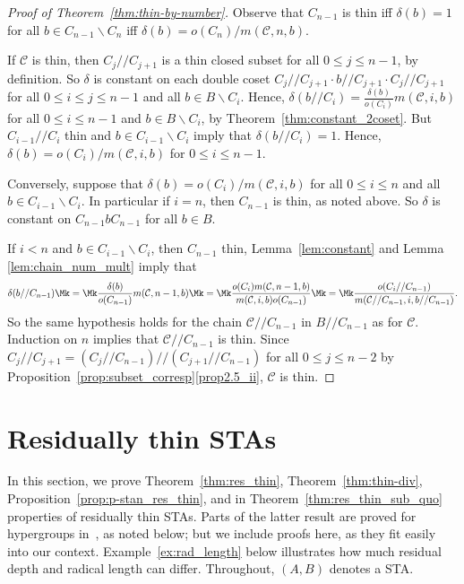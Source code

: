 \begin{proof} [Proof of Theorem~\ref{thm:thin-by-number}]

Observe that $C_{n-1}$ is thin iff $\delta(b) = 1$ for all $b \in
C_{n-1}\backslash C_n$ iff $\delta(b) =
o(C_n)/m(\mathcal{C}, n, b)$.

If $\mathcal{C}$ is thin, then $C_j//C_{j+1}$ is a thin closed subset
for all $0 \leq j \leq n-1$, by definition. So $\delta$ is constant on
each double coset $C_j//C_{j+1}\cdot b//C_{j+1}\cdot C_j//C_{j+1}$ for
all $0 \leq i \leq j \leq n-1$ and all $b \in B\backslash C_i$. Hence, $\delta(b//C_i) =
\frac{\delta(b)}{o(C_i)}m(\mathcal{C}, i, b)$ for all $0 \leq i \leq
n-1$ and $b \in B\backslash C_i$, by Theorem~\ref{thm:constant_2coset}.
But $C_{i-1}//C_i$ thin and $b \in C_{i-1}\backslash C_i$ imply that
$\delta(b//C_i) = 1$. Hence, $\delta(b) = o(C_i)/m(\mathcal{C},
i, b)$ for $0 \leq i \leq n-1$.

Conversely, suppose that $\delta(b) = o(C_i)/m(\mathcal{C}, i, b)$ for
all $0 \leq i \leq n$ and all $b \in C_{i-1}\backslash C_i$. In
particular if $i = n$, then $C_{n-1}$ is thin, as noted above. So
$\delta$ is constant on $C_{n-1}bC_{n-1}$ for all $b \in B$.

If $i < n$ and $b \in C_{i-1}\backslash C_i$, then $C_{n-1}$ thin, Lemma~\ref{lem:constant} and Lemma
\ref{lem:chain_num_mult} imply that
\[
\delta(b//C_{n-1}) \Mk = \Mk  \frac{\delta(b)}{o(C_{n-1})}m(\mathcal{C}, n-1,
b) \Mk =\Mk  \frac{o(C_i)m(\mathcal{C}, n-1, b)}{m(\mathcal{C}, i, b)o(C_{n-1})}
\Mk =\Mk  \frac{o(C_i//C_{n-1})}{m(\mathcal{C}//C_{n-1}, i, b//C_{n-1})}.
\]
So the same hypothesis holds for the chain $\mathcal{C}//C_{n-1}$ in
$B//C_{n-1}$ as for $\mathcal{C}$. Induction on $n$ implies that
$\mathcal{C}//C_{n-1}$ is thin. Since $C_j//C_{j+1} =
(C_j//C_{n-1})//(C_{j+1}//C_{n-1})$ for all $0 \leq j \leq n-2$ by
Proposition~\ref{prop:subset_corresp}\ref{prop2.5_ii}, $\mathcal{C}$ is thin.
\end{proof}


\section{Residually thin STAs}\label{sect4}


In this section, we prove Theorem~\ref{thm:res_thin}, Theorem~\ref{thm:thin-div}, Proposition~\ref{prop:p-stan_res_thin}, and in
Theorem~\ref{thm:res_thin_sub_quo} 
properties of residually thin STAs. 
 Parts of the latter result are proved for
hypergroups in~\cite {FZ}, as noted below; but we include proofs here,
as they fit easily into our context. Example~\ref{ex:rad_length}
below illustrates how much residual depth and radical length can differ.
Throughout, $(A, B)$ denotes a STA.

